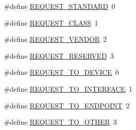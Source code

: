 \begin{DoxyCompactItemize}
\item 
\#define \hyperlink{group__USBD__Core_ga1dd6ef57678e7af95d835049d5b355b9}{R\+E\+Q\+U\+E\+S\+T\+\_\+\+S\+T\+A\+N\+D\+A\+RD}~0
\item 
\#define \hyperlink{group__USBD__Core_gafd24e03239e2df9e6d9c6cbcd53c1337}{R\+E\+Q\+U\+E\+S\+T\+\_\+\+C\+L\+A\+SS}~1
\item 
\#define \hyperlink{group__USBD__Core_ga40131e4daec200a7d931c2b26e43d27f}{R\+E\+Q\+U\+E\+S\+T\+\_\+\+V\+E\+N\+D\+OR}~2
\item 
\#define \hyperlink{group__USBD__Core_ga63cb1192a7cd205455bddd302f67c915}{R\+E\+Q\+U\+E\+S\+T\+\_\+\+R\+E\+S\+E\+R\+V\+ED}~3
\end{DoxyCompactItemize}
\begin{DoxyCompactItemize}
\item 
\#define \hyperlink{group__USBD__Core_gaf89871a0b4aa9411e09a9961de76e76f}{R\+E\+Q\+U\+E\+S\+T\+\_\+\+T\+O\+\_\+\+D\+E\+V\+I\+CE}~0
\item 
\#define \hyperlink{group__USBD__Core_ga0e5e473281fc9c1ee1ea446823c02623}{R\+E\+Q\+U\+E\+S\+T\+\_\+\+T\+O\+\_\+\+I\+N\+T\+E\+R\+F\+A\+CE}~1
\item 
\#define \hyperlink{group__USBD__Core_ga4c4571ca0bf6b462bd8954a95456561c}{R\+E\+Q\+U\+E\+S\+T\+\_\+\+T\+O\+\_\+\+E\+N\+D\+P\+O\+I\+NT}~2
\item 
\#define \hyperlink{group__USBD__Core_gad1f005d9ae04da7324d465a86e489af5}{R\+E\+Q\+U\+E\+S\+T\+\_\+\+T\+O\+\_\+\+O\+T\+H\+ER}~3
\end{DoxyCompactItemize}
